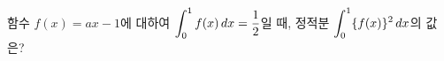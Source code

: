 함수 $f(x)=ax-1$에 대하여 $\displaystyle\int_{0}^{1} f(x)\mkern3mu dx=\dfrac{1}{2}$일 때, 정적분 $\displaystyle\int_{0}^{1}\{f(x)\}^2\mkern3mu dx$의 값은? 
